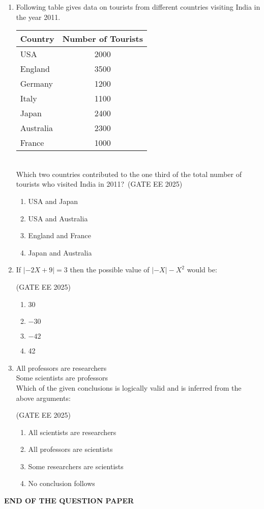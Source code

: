 \documentclass[journal,12pt,onecolumn]{IEEEtran}
\theoremstyle{remark}
\begin{document}
\begin{enumerate}
\item Following table gives data on tourists from different countries visiting India in the year 2011.\\
\begin{tabular}{lc}
\toprule
Country & Number of Tourists \\
\midrule
USA & 2000 \\
England & 3500 \\
Germany & 1200 \\
Italy & 1100 \\
Japan & 2400 \\
Australia & 2300 \\
France & 1000 \\
\bottomrule
\end{tabular}\\
Which two countries contributed to the one third of the total number of tourists who visited India in 2011?\
\hfill(GATE EE 2025)
\begin{enumerate}
    \item USA and Japan 
    \item USA and Australia
    \item England and France 
    \item Japan and Australia
\end{enumerate}

\item If $|{-}2X+9|=3$ then the possible value of $|{-}X|-X^2$ would be:\

\hfill(GATE EE 2025)

\begin{multicols}{4}
    \begin{enumerate}
        \item 30
        \item $-30$
        \item $-42$
        \item 42
    \end{enumerate}
\end{multicols}

\item All professors are researchers\\ Some scientists are professors\\
Which of the given conclusions is logically valid and is inferred from the above arguments:\

\hfill(GATE EE 2025)

\begin{enumerate}
    \item All scientists are researchers 
    \item All professors are scientists 
    \item Some researchers are scientists 
    \item No conclusion follows
\end{enumerate}
\end{enumerate}

\vfill
\begin{center}
\textbf{END OF THE QUESTION PAPER}
\end{center}
\end{document}
